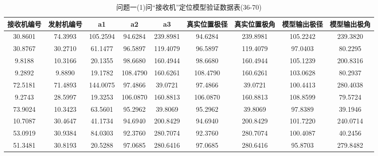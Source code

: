 \documentclass[withoutpreface,bwprint]{cumcmthesis} %
\begin{document}
\begin{appendices}
						\begin{table}[htbp!]
						\caption{问题一(1)问“接收机”定位模型验证数据表(36-70)}
						\footnotesize
						\centering
						\centering
						\begin{tabular}{@{}ccccccccc@{}}
							\toprule
							\textbf{接收机编号} & \textbf{发射机编号} & \textbf{a1} & \textbf{a2} & \textbf{a3} & \textbf{真实位置极径} & \textbf{真实位置极角} & \textbf{模型输出极径} & \textbf{模型输出极角} \\ \midrule
							30.8601        & 74.3993        & 105.2594    & 94.6284     & 239.8981    & 94.6284         & 239.8981        & 105.2242        & 239.3820        \\
							30.8767        & 30.2710        & 61.1477     & 96.5897     & 119.4079    & 96.5897         & 119.4079        & 97.0403         & 80.2295         \\
							9.8188         & 10.3166        & 20.1355     & 98.6680     & 160.4944    & 98.6680         & 160.4944        & 105.1239        & 200.8316        \\
							9.2892         & 9.8890         & 19.1782     & 108.4790    & 160.6261    & 108.4790        & 160.6261        & 103.0628        & 80.2937         \\
							72.5181        & 71.4893        & 144.0075    & 97.4866     & 39.0721     & 97.4866         & 39.0721         & 100.4413        & 280.4038        \\
							9.2743         & 28.5997        & 19.3253     & 106.0870    & 160.8813    & 106.0870        & 160.8813        & 108.8599        & 79.5724         \\
							73.9024        & 10.3423        & 63.5601     & 95.2962     & 39.8069     & 95.2962         & 39.8069         & 97.8389         & 39.1946         \\
							10.7087        & 30.4647        & 41.1734     & 94.6940     & 200.8429    & 94.6940         & 200.8429        & 101.7220        & 240.0714        \\
							53.0919        & 30.9384        & 84.0303     & 92.3760     & 280.7074    & 92.3760         & 280.7074        & 100.4087        & 40.2456         \\
							51.3481        & 30.8193        & 20.5288     & 97.0685     & 280.6416    & 97.0685         & 280.6416        & 95.8703         & 279.8482        \\

\end{tabular}
\end{table}
\end{appendices}
\end{document}
